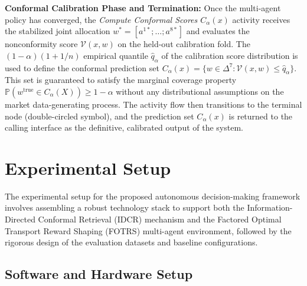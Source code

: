 \documentclass[12pt,a4paper,oneside]{report}
\theoremstyle{definition}
\theoremstyle{remark}
\begin{document}
\textbf{Conformal Calibration Phase and Termination:} Once the multi-agent policy has converged, the \emph{Compute Conformal Scores $C_\alpha(x)$} activity receives the stabilized joint allocation $w^* = [a^{1*}; \ldots; a^{8*}]$ and evaluates the nonconformity score $\mathcal{V}(x, w)$ on the held-out calibration fold. The $(1-\alpha)(1 + 1/n)$ empirical quantile $\hat{q}_\alpha$ of the calibration score distribution is used to define the conformal prediction set $C_\alpha(x) = \{w \in \Delta^7 : \mathcal{V}(x, w) \leq \hat{q}_\alpha\}$. This set is guaranteed to satisfy the marginal coverage property $\mathbb{P}(w^{\text{true}} \in C_\alpha(X)) \geq 1 - \alpha$ without any distributional assumptions on the market data-generating process. The activity flow then transitions to the terminal node (double-circled symbol), and the prediction set $C_\alpha(x)$ is returned to the calling interface as the definitive, calibrated output of the system.



\chapter{Experimental Setup}

The experimental setup for the proposed autonomous decision-making framework involves assembling a robust technology stack to support both the Information-Directed Conformal Retrieval (IDCR) mechanism and the Factored Optimal Transport Reward Shaping (FOTRS) multi-agent environment, followed by the rigorous design of the evaluation datasets and baseline configurations.

\section{Software and Hardware Setup}
\end{document}
